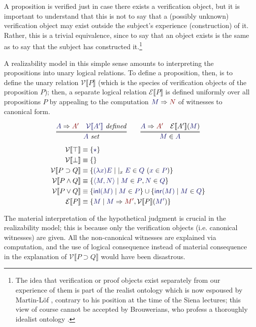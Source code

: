 \documentclass[11pt]{amsart}
\theoremstyle{definition}
\theoremstyle{remark}
\numberwithin{equation}{section}
\def\InputModeColorName{MidnightBlue}
\def\OutputModeColorName{Maroon}
\newcommand\InputMode[1]{{\color{\InputModeColorName}{#1}}}
\newcommand\OutputMode[1]{{\color{\OutputModeColorName}{#1}}}
\newcommand\HypJ[2]{#1\ (#2)}
\newcommand\GenJ[2]{\vert_{#1}\; #2}
\newcommand\IsSet[1]{\InputMode{#1}\ \mathit{set}}
\newcommand\Member[2]{\InputMode{#1}\in \InputMode{#2}}
\newcommand\Eval[2]{\InputMode{#1}\Rightarrow \OutputMode{#2}}
\newcommand\IsDefined[1]{\InputMode{#1}\ \mathit{defined}}
\newcommand\SEM[1]{\llbracket#1 \rrbracket}
\newcommand\VAL[1]{\mathcal{V}\SEM{#1}}
\newcommand\EXP[1]{\mathcal{E}\SEM{#1}}
\newcommand\True{\top}
\newcommand\False{\bot}
\newcommand\Imp[2]{#1\supset #2}
\newcommand\Conj[2]{#1\land #2}
\newcommand\Disj[2]{#1\lor #2}
\newcommand\It{\star}
\newcommand\Lam[2]{(\lambda #1) #2}
\newcommand\Pair[2]{\langle #1, #2 \rangle}
\newcommand\Inl[1]{\mathsf{inl}(#1)}
\newcommand\Inr[1]{\mathsf{inr}(#1)}
\begin{document}
A proposition is verified just in case there exists a verification object, but
it is important to understand that this is not to say that a (possibly unknown)
verification object may exist outside the subject's experience (construction) of
it. Rather, this is a trivial equivalence, since to say that an object exists is
the same as to say that the subject has constructed it.\footnote{The idea that
verification or proof objects exist separately from our experience of them is
part of the realist ontology which is now espoused by Martin-L\"of
\cite{prawitz:2012}, contrary to his position at the time of the Siena lectures;
this view of course cannot be accepted by Brouwerians, who profess a thoroughly
idealist ontology \cite{sundholm-mva, sundholm:2014}.}

A realizability model in this simple sense amounts to interpreting the
propositions into unary logical relations. To define a proposition, then, is to
define the unary relation $\VAL{P}$ (which is the species of verification
objects of the proposition $P$); then, a separate logical relation $\EXP{P}$ is
defined uniformly over all propositions $P$ by appealing to the computation
$\Eval{M}{N}$ of witnesses to canonical form.

\begin{gather*}
  \infer={
    \IsSet{A}
  }{
    \Eval{A}{A'} &
    \IsDefined{\VAL{A'}}
  } \qquad
  \infer={
    \Member{M}{A}
  }{
    \Eval{A}{A'} &
    \EXP{A'}(\InputMode{M})
  }
\end{gather*}
\begin{align*}
  \VAL{\True} &\equiv \{\InputMode{\It}\}\\
  \VAL{\False} &\equiv \{\}\\
  \VAL{\Imp{P}{Q}} &\equiv
    \{ \InputMode{\Lam{x}{E}}
    \mid \GenJ{x}{\HypJ{\Member{E}{Q}}{\Member{x}{P}}}
    \}\\
  \VAL{\Conj{P}{Q}} &\equiv
    \{ \InputMode{\Pair{M}{N}}
    \mid \Member{M}{P}, \Member{N}{Q}
    \}\\
  \VAL{\Disj{P}{Q}} &\equiv
    \{ \InputMode{\Inl{M}}
    \mid \Member{M}{P}
    \} \cup
    \{ \InputMode{\Inr{M}}
    \mid \Member{M}{Q}
    \}\\
  \EXP{P} &\equiv
    \{ \InputMode{M}
    \mid \Eval{M}{M'}, \VAL{P}(\InputMode{M'})
    \}
\end{align*}

The material interpretation of the hypothetical judgment is crucial in the
realizability model; this is because only the verification objects (i.e.
canonical witnesses) are given. All the non-canonical witnesses are explained
via computation, and the use of logical consequence instead of material
consequence in the explanation of $\VAL{\Imp{P}{Q}}$ would have been disastrous.
\end{document}
